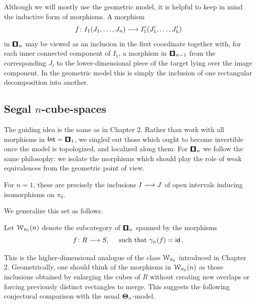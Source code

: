 \begin{remark}
    Although we will mostly use the geometric model, it is helpful to keep in mind the inductive form of morphisms. A morphism
    \begin{equation}
        f\colon I_{1}(J_1,\ldots, J_n) \longrightarrow I'_{1}(J'_{1},\ldots,J'_{k})
    \end{equation}
    in $\cube_n$ may be viewed as an inclusion in the first coordinate together with, for each inner connected component of $I_1$, a morphism in $\cube_{n-1}$ from the corresponding $J_i$ to the lower-dimensional piece of the target lying over the image component. In the geometric model this is simply the inclusion of one rectangular decomposition into another.
\end{remark}

\subsection{Segal \texorpdfstring{$n$}{n}-cube-spaces}
The guiding idea is the same as in Chapter 2. Rather than work with all morphisms in $\Int = \cube_1$, we singled out those which ought to become invertible once the model is topologized, and localized along them. For $\cube_n$ we follow the same philosophy: we isolate the morphisms which should play the role of weak equivalences from the geometric point of view.

\begin{remark}
For $n=1$, these are precisely the inclusions $I \longrightarrow J$ of open intervals inducing isomorphisms on $\pi_0$. 
\end{remark}

We generalize this set as follows.

\begin{definition}
    Let $\mathcal W_{\pi_{0}}(n)$ denote the subcategory of $\cube_n$ spanned by the morphisms 
    \begin{equation}
    f\colon R \longrightarrow S, \quad \text{ such that } \gamma_n(f) = \operatorname{\sf id}.
    \end{equation} 
\end{definition}

This is the higher-dimensional analogue of the class $\mathcal W_{\pi_{0}}$ introduced in Chapter 2. Geometrically, one should think of the morphisms in $\mathcal W_{\pi_{0}}(n)$ as those inclusions obtained by enlarging the cubes of $R$ without creating new overlaps or forcing previously distinct rectangles to merge. This suggests the following conjectural comparison with the usual $\mathbf\Theta_n$-model.   

